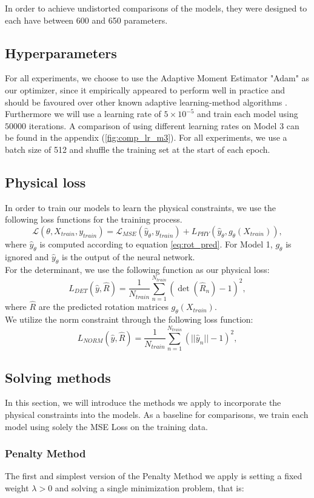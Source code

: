 \indent In order to achieve undistorted comparisons of the models, they were designed to each have between 600 and 650 parameters.

\subsection{Hyperparameters}
For all experiments, we choose to use the Adaptive Moment Estimator "Adam" as our optimizer, since it empirically appeared to perform well in practice and should be favoured over other known adaptive learning-method algorithms \cite{DBLP:journals/corr/Ruder16}. Furthermore we will use a learning rate of $5\times 10^{-5}$ and train each model using $50000$ iterations. A comparison of using different learning rates on Model 3 can be found in the appendix (\ref{fig:comp_lr_m3}). For all experiments, we use a batch size of 512 and shuffle the training set at the start of each epoch.

\subsection{Physical loss}
In order to train our models to learn the physical constraints, we use the following loss functions for the training process.
\[\mathcal{L}(\theta, X_{train}, y_{train}) = \mathcal{L}_{MSE}(\hat{y}_\theta, y_{train}) + L_{PHY}(\hat{y}_\theta, g_\theta(X_{train})),\]
where $\hat{y}_\theta$ is computed according to equation \ref{eq:rot_pred}. For Model 1, $g_\theta$ is ignored and $\hat{y}_\theta$ is the output of the neural network.\\
For the determinant, we use the following function as our physical loss:
\[L_{DET}(\hat{y}, \hat{R}) = \frac{1}{N_{train}}\sum_{n = 1}^{N_{train}}(\det(\hat{R}_n) - 1)^2,\]
where $\hat{R}$ are the predicted rotation matrices $g_\theta(X_{train})$.\\
We utilize the norm constraint through the following loss function:
\[L_{NORM}(\hat{y}, \hat{R}) = \frac{1}{N_{train}}\sum_{n = 1}^{N_{train}}(||\hat{y}_n|| - 1)^2,\]

\subsection{Solving methods}
In this section, we will introduce the methods we apply to incorporate the physical constraints into the models. As a baseline for comparisons, we train each model using solely the MSE Loss on the training data.

\subsubsection{Penalty Method}
The first and simplest version of the Penalty Method we apply is setting a fixed weight $\lambda > 0$ and solving a single minimization problem, that is:

